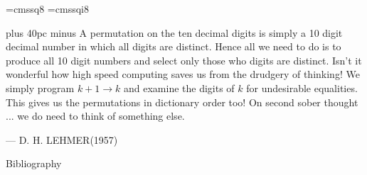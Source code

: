 \documentclass[aspectratio=169]{beamer}
\begin{document}
\font\eightss=cmssq8
\font\eightssi=cmssqi8
\newcommand\quoteAuthorDate[3]{\begingroup
  \baselineskip 10pt
  \parfillskip 0pt
  \interlinepenalty 10000 %
  \leftskip 0pt plus 40pc minus \parindent
  \let\rm=\eightss
  \let\sl=\eightssi
  \everypar{\sl}#1\par
  \nobreak\smallskip
  \noindent\rm--- #2\unskip\enspace(#3)\par
  \endgroup}

\begin{frame}
    \begin{center}
        \item \quoteAuthorDate{A permutation on the ten decimal digits is simply a 10 digit decimal number in which all digits are distinct. Hence all we need to do is to produce all 10 digit numbers and select only those who digits are distinct. Isn't it wonderful how high speed computing saves us from the drudgery of thinking! We simply program $k+1 \to k$ and examine the digits of $k$ for undesirable equalities. This gives us the permutations in dictionary order too! \newline On second sober thought ... we do need to think of something else.}{D. H. LEHMER}{\color{sigma@mainblue}1957}
    \end{center}
\end{frame}

\begin{frame}{Bibliography}
    
    
\end{frame}
\end{document}
